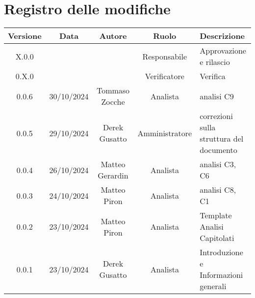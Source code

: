 
\section*{Registro delle modifiche}
\begin{table}[H]
    \begin{tabular}{|c|c|c|c|p{3cm}|}
        \hline
        \textbf{Versione} &  \textbf{Data} &  \textbf{Autore} &  \textbf{Ruolo} & \textbf{Descrizione} \\
        \hline
        X.0.0 &  &  & Responsabile & Approvazione e rilascio\\
        \hline
        0.X.0 &  &  & Verificatore & Verifica\\
        \hline
        0.0.6 & 30/10/2024 & Tommaso Zocche & Analista & analisi C9 \\
        \hline
        0.0.5 & 29/10/2024 & Derek Gusatto & Amministratore &  correzioni sulla struttura del documento\\
        \hline
        0.0.4 & 26/10/2024 & Matteo Gerardin & Analista & analisi C3, C6 \\
        \hline
        0.0.3 & 24/10/2024 & Matteo Piron & Analista & analisi C8, C1 \\
        \hline
        0.0.2 & 23/10/2024 & Matteo Piron & Analista & Template Analisi Capitolati \\
        \hline
        0.0.1 & 23/10/2024 & Derek Gusatto & Analista & Introduzione e Informazioni generali \\
        \hline
    \end{tabular}
\end{table}